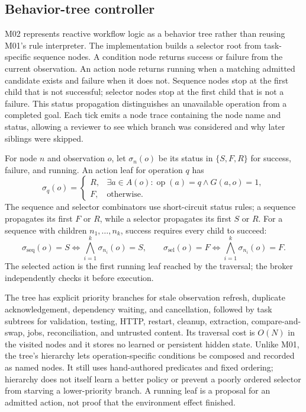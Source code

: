 \subsection{Behavior-tree controller}\label{sec:method-m02}
M02 represents reactive workflow logic as a behavior tree rather than reusing M01's rule interpreter. The implementation builds a selector root from task-specific sequence nodes. A condition node returns success or failure from the current observation. An action node returns running when a matching admitted candidate exists and failure when it does not. Sequence nodes stop at the first child that is not successful; selector nodes stop at the first child that is not a failure. This status propagation distinguishes an unavailable operation from a completed goal. Each tick emits a node trace containing the node name and status, allowing a reviewer to see which branch was considered and why later siblings were skipped.

For node $n$ and observation $o$, let $\sigma_n(o)$ be its status in $\{S,F,R\}$ for success, failure, and running. An action leaf for operation $q$ has
\begin{equation}
\sigma_{q}(o)=\begin{cases}R,&\exists a\in A(o):\operatorname{op}(a)=q\land G(a,o)=1,\\F,&\text{otherwise.}\end{cases}
\end{equation}
The sequence and selector combinators use short-circuit status rules; a sequence propagates its first $F$ or $R$, while a selector propagates its first $S$ or $R$. For a sequence with children $n_1,\ldots,n_k$, success requires every child to succeed:
\begin{equation}
\sigma_{\mathrm{seq}}(o)=S\iff\bigwedge_{i=1}^{k}\sigma_{n_i}(o)=S,\qquad
\sigma_{\mathrm{sel}}(o)=F\iff\bigwedge_{i=1}^{k}\sigma_{n_i}(o)=F.
\end{equation}
The selected action is the first running leaf reached by the traversal; the broker independently checks it before execution.

The tree has explicit priority branches for stale observation refresh, duplicate acknowledgement, dependency waiting, and cancellation, followed by task subtrees for validation, testing, HTTP, restart, cleanup, extraction, compare-and-swap, jobs, reconciliation, and untrusted content. Its traversal cost is $O(N)$ in the visited nodes and it stores no learned or persistent hidden state. Unlike M01, the tree's hierarchy lets operation-specific conditions be composed and recorded as named nodes. It still uses hand-authored predicates and fixed ordering; hierarchy does not itself learn a better policy or prevent a poorly ordered selector from starving a lower-priority branch. A running leaf is a proposal for an admitted action, not proof that the environment effect finished.

